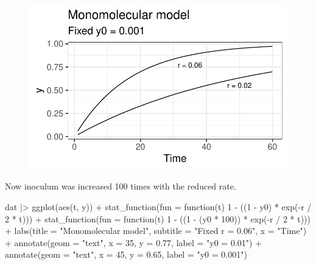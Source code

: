 \documentclass[
  letterpaper,
  DIV=11,
  numbers=noendperiod]{scrreprt}
\newenvironment{Shaded}{\begin{snugshade}}{\end{snugshade}}
\newcommand{\AttributeTok}[1]{\textcolor[rgb]{0.40,0.45,0.13}{#1}}
\newcommand{\ControlFlowTok}[1]{\textcolor[rgb]{0.00,0.23,0.31}{#1}}
\newcommand{\DecValTok}[1]{\textcolor[rgb]{0.68,0.00,0.00}{#1}}
\newcommand{\FloatTok}[1]{\textcolor[rgb]{0.68,0.00,0.00}{#1}}
\newcommand{\FunctionTok}[1]{\textcolor[rgb]{0.28,0.35,0.67}{#1}}
\newcommand{\NormalTok}[1]{\textcolor[rgb]{0.00,0.23,0.31}{#1}}
\newcommand{\SpecialCharTok}[1]{\textcolor[rgb]{0.37,0.37,0.37}{#1}}
\newcommand{\StringTok}[1]{\textcolor[rgb]{0.13,0.47,0.30}{#1}}
\begin{document}
\begin{figure}[H]

{\centering \includegraphics{./temporal-models_files/figure-pdf/unnamed-chunk-10-1.pdf}

}

\end{figure}

Now inoculum was increased 100 times with the reduced rate.

\begin{Shaded}
\begin{Highlighting}[]
\NormalTok{dat }\SpecialCharTok{|\textgreater{}}
  \FunctionTok{ggplot}\NormalTok{(}\FunctionTok{aes}\NormalTok{(t, y)) }\SpecialCharTok{+}
  \FunctionTok{stat\_function}\NormalTok{(}\AttributeTok{fun =} \ControlFlowTok{function}\NormalTok{(t) }\DecValTok{1} \SpecialCharTok{{-}}\NormalTok{ ((}\DecValTok{1} \SpecialCharTok{{-}}\NormalTok{ y0) }\SpecialCharTok{*} \FunctionTok{exp}\NormalTok{(}\SpecialCharTok{{-}}\NormalTok{r }\SpecialCharTok{/} \DecValTok{2} \SpecialCharTok{*}\NormalTok{ t))) }\SpecialCharTok{+}
  \FunctionTok{stat\_function}\NormalTok{(}\AttributeTok{fun =} \ControlFlowTok{function}\NormalTok{(t) }\DecValTok{1} \SpecialCharTok{{-}}\NormalTok{ ((}\DecValTok{1} \SpecialCharTok{{-}}\NormalTok{ (y0 }\SpecialCharTok{*} \DecValTok{100}\NormalTok{)) }\SpecialCharTok{*} \FunctionTok{exp}\NormalTok{(}\SpecialCharTok{{-}}\NormalTok{r }\SpecialCharTok{/} \DecValTok{2} \SpecialCharTok{*}\NormalTok{ t))) }\SpecialCharTok{+}
  \FunctionTok{labs}\NormalTok{(}\AttributeTok{title =} \StringTok{"Monomolecular model"}\NormalTok{, }
       \AttributeTok{subtitle =} \StringTok{"Fixed r = 0.06"}\NormalTok{, }\AttributeTok{x =} \StringTok{"Time"}\NormalTok{) }\SpecialCharTok{+}
  \FunctionTok{annotate}\NormalTok{(}\AttributeTok{geom =} \StringTok{"text"}\NormalTok{, }\AttributeTok{x =} \DecValTok{35}\NormalTok{, }\AttributeTok{y =} \FloatTok{0.77}\NormalTok{, }\AttributeTok{label =} \StringTok{"y0 = 0.01"}\NormalTok{) }\SpecialCharTok{+}
  \FunctionTok{annotate}\NormalTok{(}\AttributeTok{geom =} \StringTok{"text"}\NormalTok{, }\AttributeTok{x =} \DecValTok{45}\NormalTok{, }\AttributeTok{y =} \FloatTok{0.65}\NormalTok{, }\AttributeTok{label =} \StringTok{"y0 = 0.001"}\NormalTok{)}
\end{Highlighting}
\end{Shaded}
\end{document}
